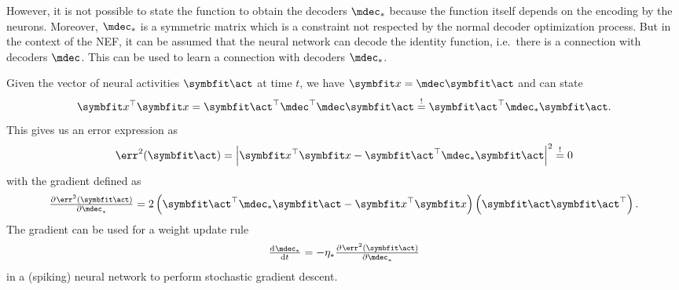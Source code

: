 However, it is not possible to state the function to obtain the decoders $\mdec_*$ because the function itself depends on the encoding by the neurons.
Moreover, $\mdec_*$ is a symmetric matrix which is a constraint not respected by the normal decoder optimization process.
But in the context of the NEF, it can be assumed that the neural network can decode the identity function, i.e.\ there is a connection with decoders $\mdec$.
This can be used to learn a connection with decoders $\mdec_*$.

Given the vector of neural activities $\vc \act$ at time $t$, we have $\vc x = \mdec \vc \act$ and can state
\begin{equation}
    \vc x\Tr \vc x = \vc \act\Tr \mdec\Tr \mdec \vc\act \overset{!}{=} \vc\act\Tr\mdec_*\vc\act \text{.}
\end{equation}
This gives us an error expression as
\begin{equation}
    \err^2(\vc\act) = \left\lvert\vc x\Tr \vc x - \vc\act\Tr \mdec_* \vc\act\right\rvert^2 \overset{!}{=} 0
\end{equation}
with the gradient defined as
\begin{equation}
    \pd{\err^2(\vc\act)}{\mdec_*} = 2 \del{\vc\act\Tr \mdec_* \vc\act - \vc x\Tr \vc x} \del{\vc\act \vc\act\Tr} \text{.}
\end{equation}
The gradient can be used for a weight update rule
\begin{equation}
    \od{\mdec_*}{t} = -\eta_* \pd{\err^2(\vc\act)}{\mdec_*}
\end{equation}
in a (spiking) neural network to perform stochastic gradient descent.

